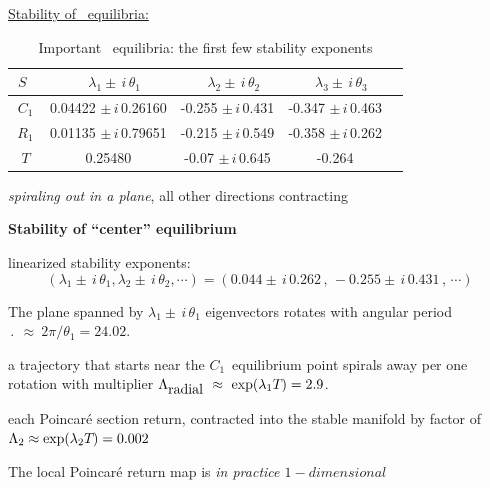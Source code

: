 \underline{Stability of \KS\ equilibria:}{
\begin{table}
\caption[]{
Important \KS\ equilibria:
the first few stability exponents
}
\begin{center} \footnotesize
\begin{tabular}{@{}ccccc}
\hline %
$~S~~~$ & $~~~~\lambda_1 \pm \,i\,\theta_1$
                                & $~~~~\lambda_2 \pm \,i\,\theta_2$
                                        & $~~~~\lambda_3 \pm \,i\,\theta_3$
\\
\hline %
${C_1}$    &{0.04422 $\pm \,i\,$0.26160}   &-0.255 $\pm \,i\,$0.431
&-0.347 $\pm \,i\,$0.463         \\
\hline %
${R_1}$   &{0.01135 $\pm \,i\,$0.79651} & -0.215 $\pm \,i\,$0.549
&-0.358 $\pm \,i\,$0.262        \\
\hline %
${T}$     & 0.25480  & -0.07 $\pm \,i\,$0.645 &-0.264
\\
\hline %
\end{tabular}
\end{center}
\label{t:stationary}
\end{table}

{\em
spiraling out in a plane}, all other directions contracting


{\bf
Stability of ``center'' equilibrium
    }

linearized stability exponents:
\[ %
(\lambda_{1}\pm\,i\,\theta_{1},\lambda_{2} \pm\,i\,\theta_{2}, \cdots)
    = (0.044 \pm \,i\,0.262\,,\,
        -0.255 \pm \,i\,0.431\,,\,\cdots)
\] %

The plane spanned by $\lambda_{1} \pm\,i\,\theta_{1}$ eigenvectors rotates with angular period
$\period{} ~\approx~2\pi/\theta_{1}=24.02$.

a trajectory
that starts near  the $C_1$~equilibrium point spirals
away per one rotation
with multiplier
$\Lambda_{\mbox{radial}}~\approx~\exp(\lambda_{1}{T_{}})=2.9$.

each Poincar\' e section return,
contracted into the stable manifold by
factor of
{
$\Lambda_{2}\approx\exp(\lambda_{2}{T_{}})=0.002$
}


The local Poincar\' e return map is
{\em
in practice $1-dimensional$
}
    } %


